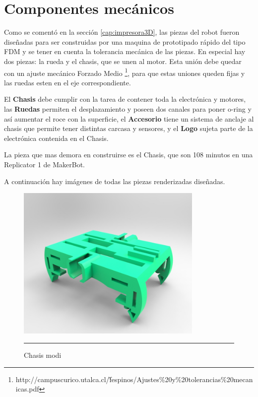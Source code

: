 \section{Componentes mecánicos}

Como se comentó en la sección \ref{cap:impresora3D}, las piezas del robot fueron diseñadas para ser construidas por una maquina de prototipado rápido del tipo FDM y se tener en cuenta la tolerancia mecánica de las piezas. En especial hay dos piezas: la rueda y el chasis, que se unen al motor. Esta unión debe quedar con un ajuste mecánico Forzado Medio \footnote{http://campuscurico.utalca.cl/\~ fespinos/Ajustes\%20y\%20tolerancias\%20mecanicas.pdf}, para que estas uniones queden fijas y las ruedas esten en el eje correspondiente.

El \textbf{Chasis} debe cumplir con la tarea de contener toda la electrónica y motores, las \textbf{Ruedas} permiten el desplazamiento y poseen dos canales para poner o-ring y así aumentar el roce con la superficie, el \textbf{Accesorio} tiene un sistema de anclaje al chasis que permite tener distintas carcasa y sensores, y el \textbf{Logo} sujeta parte de la electrónica contenida en el Chasis. 

La pieza que mas demora en construirse es el Chasis, que son 108 minutos en una Replicator 1 de MakerBot.

A continuación hay imágenes de todas las piezas renderizadas diseñadas.
\begin{figure}[htbp]
	\centering
		\includegraphics[width=0.8\textwidth]{./Figures/MODI/chasismodi.jpg}
		\rule{35em}{0.5pt}
	\caption[chasismodi]{Chasis modi}
	\label{fig:chasismodi}
\end{figure}

